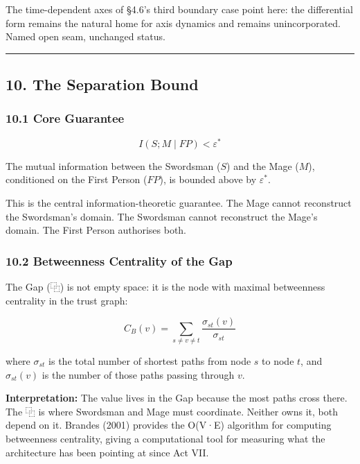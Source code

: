 \documentclass[
]{article}
\begin{document}
The time-dependent axes of §4.6's third boundary case point here: the
differential form remains the natural home for axis dynamics and remains
unincorporated. Named open seam, unchanged status.

\begin{center}\rule{0.5\linewidth}{0.5pt}\end{center}

\subsection{10. The Separation Bound}\label{the-separation-bound}

\subsubsection{10.1 Core Guarantee}\label{core-guarantee}

\[I(S ; M \mid FP) < \varepsilon^*\]

The mutual information between the Swordsman (\(S\)) and the Mage
(\(M\)), conditioned on the First Person (\(FP\)), is bounded above by
\(\varepsilon^*\).

This is the central information-theoretic guarantee. The Mage cannot
reconstruct the Swordsman's domain. The Swordsman cannot reconstruct the
Mage's domain. The First Person authorises both.

\subsubsection{10.2 Betweenness Centrality of the
Gap}\label{betweenness-centrality-of-the-gap}

The Gap (⿻) is not empty space: it is the node with maximal betweenness
centrality in the trust graph:

\[C_B(v) = \sum_{s \neq v \neq t} \frac{\sigma_{st}(v)}{\sigma_{st}}\]

where \(\sigma_{st}\) is the total number of shortest paths from node
\(s\) to node \(t\), and \(\sigma_{st}(v)\) is the number of those paths
passing through \(v\).

\textbf{Interpretation:} The value lives in the Gap because the most
paths cross there. The ⿻ is where Swordsman and Mage must coordinate.
Neither owns it, both depend on it. Brandes (2001) provides the O(V·E)
algorithm for computing betweenness centrality, giving a computational
tool for measuring what the architecture has been pointing at since Act
VII.
\end{document}
